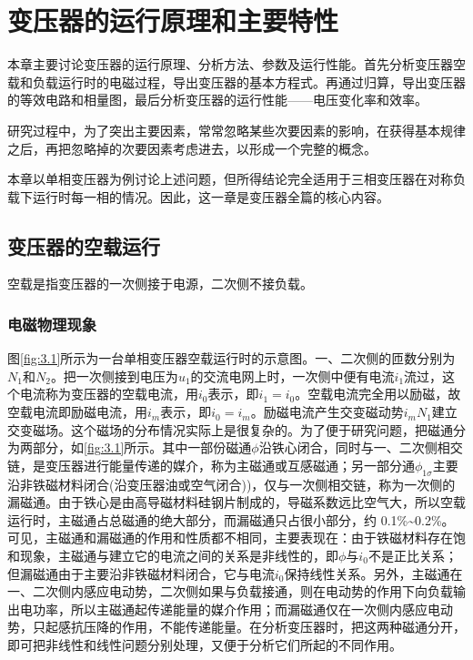 \documentclass{book}
\begin{document}
\chapter{变压器的运行原理和主要特性}
本章主要讨论变压器的运行原理、分析方法、参数及运行性能。首先分析变压器空载和负载运行时的电磁过程，导出变压器的基本方程式。再通过归算，导出变压器的等效电路和相量图，最后分析变压器的运行性能——电压变化率和效率。

研究过程中，为了突出主要因素，常常忽略某些次要因素的影响，在获得基本规律之后，再把忽略掉的次要因素考虑进去，以形成一个完整的概念。

本章以单相变压器为例讨论上述问题，但所得结论完全适用于三相变压器在对称负载下运行时每一相的情况。因此，这一章是变压器全篇的核心内容。

\section{变压器的空载运行}
空载是指变压器的一次侧接于电源，二次侧不接负载。
\subsection{电磁物理现象}
图\ref{fig:3.1}所示为一台单相变压器空载运行时的示意图。一、二次侧的匝数分别为${{N}_{1}}$和${{N}_{2}}$。把一次侧接到电压为${{u}_{1}}$的交流电网上时，一次侧中便有电流${{i}_{1}}$流过，这个电流称为变压器的空载电流，用${{i}_{0}}$表示，即${{i}_{1}}={{i}_{0}}$。空载电流完全用以励磁，故空载电流即励磁电流，用${{i}_{m}}$表示，即${{i}_{0}}={{i}_{m}}$。励磁电流产生交变磁动势${{i}_{m}}{{N}_{1}}$建立交变磁场。这个磁场的分布情况实际上是很复杂的。为了便于研究问题，把磁通分为两部分，如\ref{fig:3.1}所示。其中一部份磁通$\phi$沿铁心闭合，同时与一、二次侧相交链，是变压器进行能量传递的媒介，称为主磁通或互感磁通；另一部分通${{\phi }_{1\sigma }}$主要沿非铁磁材料闭合(沿变压器油或空气闭合))，仅与一次侧相交链，称为一次侧的漏磁通。由于铁心是由高导磁材料硅钢片制成的，导磁系数远比空气大，所以空载运行时，主磁通占总磁通的绝大部分，而漏磁通只占很小部分，约 0.1\%\textasciitilde0.2\%。可见，主磁通和漏磁通的作用和性质都不相同，主要表现在：由于铁磁材料存在饱和现象，主磁通与建立它的电流之间的关系是非线性的，即$\phi$与${{i}_{0}}$不是正比关系；但漏磁通由于主要沿非铁磁材料闭合，它与电流${{i}_{0}}$保持线性关系。另外，主磁通在一、二次侧内感应电动势，二次侧如果与负载接通，则在电动势的作用下向负载输出电功率，所以主磁通起传递能量的媒介作用；而漏磁通仅在一次侧内感应电动势，只起感抗压降的作用，不能传递能量。在分析变压器时，把这两种磁通分开，即可把非线性和线性问题分别处理，又便于分析它们所起的不同作用。
\end{document}
